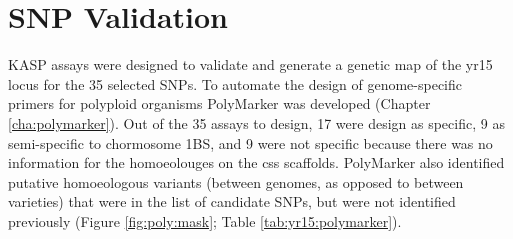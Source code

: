 \section {SNP Validation}

KASP assays were designed to validate and generate a genetic map of the \acrshort{yr15} locus for the 35 selected SNPs. 
To automate the design of genome-specific primers for polyploid organisms PolyMarker was developed (Chapter \ref{cha:polymarker}).
Out of the 35 assays to design, 17 were design as specific, 9 as semi-specific to chormosome 1BS, and 9 were not specific because there was no information for the homoeolouges on the \acrshort{css} scaffolds. 
PolyMarker also identified putative homoeologous variants (between genomes, as opposed to between varieties) that were in the list of candidate SNPs, but were not identified previously (Figure \ref{fig:poly:mask}; Table \ref{tab:yr15:polymarker}). 


